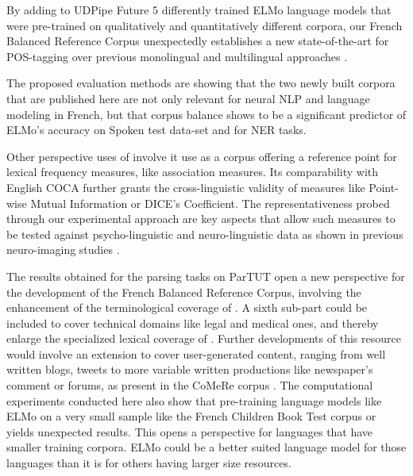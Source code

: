By adding to UDPipe Future 5 differently trained ELMo language models that were pre-trained on qualitatively and quantitatively different corpora, our French Balanced Reference Corpus \Cabernet unexpectedly establishes a new state-of-the-art for POS-tagging over previous monolingual \citep{straka-2018-udpipe} and multilingual approaches \citep{straka-strakova-2019-evaluating,kondratyuk-straka-2019-75}.

The proposed evaluation methods are showing that the two newly built corpora that are published here are not only relevant for neural NLP and language modeling in French, but that corpus balance shows to be a significant predictor of ELMo's accuracy on Spoken test data-set and for NER tasks.

Other perspective uses of \Cabernet involve it use as a corpus offering a reference point for lexical frequency measures, like association measures. Its comparability with English COCA further grants the cross-linguistic validity of measures like Point-wise Mutual Information or DICE's Coefficient. The representativeness probed through our experimental approach are key aspects that allow such measures to be tested against psycho-linguistic and neuro-linguistic data as shown in previous neuro-imaging studies \citep{bhattasali-etal-2018-processing}.

The results obtained for the parsing tasks on ParTUT open a new perspective for the development of the French Balanced Reference Corpus, involving the enhancement of the terminological coverage of \Cabernet. A sixth sub-part could be included to cover technical domains like legal and medical ones, and thereby enlarge the specialized lexical coverage of \Cabernet.
Further developments of this resource would involve an extension to cover user-generated content, ranging from well written blogs, tweets to more variable written productions like newspaper's comment or forums, as present in the CoMeRe corpus \citep{chanier-etal-2014-the}.%
The computational experiments conducted here also show that pre-training language models like ELMo on a very small sample like the French Children Book Test corpus or \Cabernet yields unexpected results. This opens a perspective for languages that have smaller training corpora. ELMo could be a better suited language model for those languages than it is for others having larger size resources.

